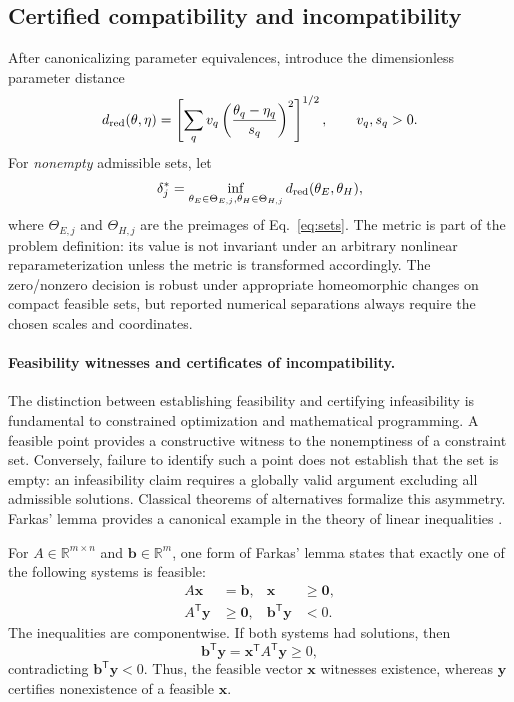 \documentclass[11pt]{article}
\begin{document}
\subsection{Certified compatibility and incompatibility}
After canonicalizing parameter equivalences, introduce the dimensionless parameter distance
\begin{equation}\label{eq:metric}
d_{\rm red}(\theta,\eta)=\left[\sum_q v_q\left(\frac{\theta_q-\eta_q}{s_q}\right)^2\right]^{1/2},\qquad v_q,s_q>0.
\end{equation}
For \emph{nonempty} admissible sets, let
\begin{equation}\label{eq:delta}
\delta_j^*=\inf_{\theta_E\in\Theta_{E,j},\theta_H\in\Theta_{H,j}}d_{\rm red}(\theta_E,\theta_H),
\end{equation}
where $\Theta_{E,j}$ and $\Theta_{H,j}$ are the preimages of Eq.~\eqref{eq:sets}. The metric is part of the problem definition: its value is not invariant under an arbitrary nonlinear reparameterization unless the metric is transformed accordingly. The zero/nonzero decision is robust under appropriate homeomorphic changes on compact feasible sets, but reported numerical separations always require the chosen scales and coordinates.

\paragraph{Feasibility witnesses and certificates of incompatibility.}
\label{subsec:feasibility-certificates}
The distinction between establishing feasibility and certifying infeasibility is
fundamental to constrained optimization and mathematical programming. A feasible
point provides a constructive witness to the nonemptiness of a constraint set.
Conversely, failure to identify such a point does not establish that the set is
empty: an infeasibility claim requires a globally valid argument excluding all
admissible solutions. Classical theorems of alternatives formalize this
asymmetry. Farkas' lemma provides a canonical example in the theory of linear
inequalities \cite{farkas1902}.

For $A\in\mathbb{R}^{m\times n}$ and $\mathbf b\in\mathbb{R}^{m}$, one form
of Farkas' lemma states that exactly one of the following systems is feasible:
\begin{align}
  A\mathbf x &= \mathbf b, & \mathbf x &\geq \mathbf 0,
  \label{eq:farkas-primal}\\
  A^{\mathsf T}\mathbf y &\geq \mathbf 0, &
  \mathbf b^{\mathsf T}\mathbf y &<0.
  \label{eq:farkas-dual}
\end{align}
The inequalities are componentwise. If both systems had solutions, then
\begin{equation}
  \mathbf b^{\mathsf T}\mathbf y
  =\mathbf x^{\mathsf T}A^{\mathsf T}\mathbf y\geq0,
  \label{eq:farkas-contradiction}
\end{equation}
contradicting $\mathbf b^{\mathsf T}\mathbf y<0$. Thus, the feasible vector
$\mathbf x$ witnesses existence, whereas $\mathbf y$ certifies nonexistence
of a feasible $\mathbf x$.
\end{document}
